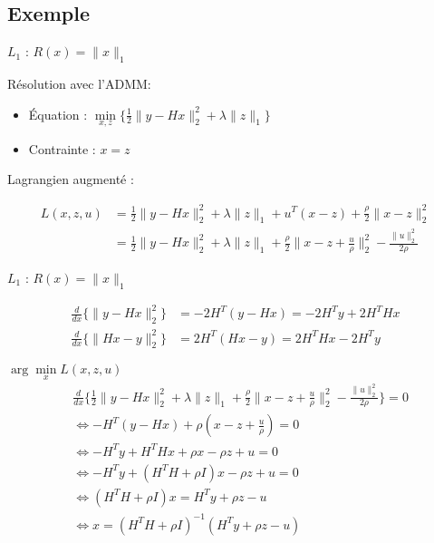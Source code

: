 \subsection{Exemple}

\frame{
    \tableofcontents[ 
        currentsubsection, 
    ]
}

\begin{frame}{$L_{1}$ : $R(x) = \lVert x \rVert_{1}$}

Résolution avec l'ADMM:
\begin{itemize}
    \item Équation : $\min\limits_{x, z} \{ 
        \frac{1}{2} \lVert y - Hx \rVert_{2}^{2} 
        + \lambda \lVert z \rVert_{1} 
    \}$
    \item Contrainte : $x = z$
\end{itemize}

\vspace{5mm}

Lagrangien augmenté :

\begin{align*}
L(x, z, u) 
&= \frac{1}{2} \lVert y - Hx \rVert_{2}^{2} 
+ \lambda \lVert z \rVert_{1} 
+ u^{T}(x-z) + \frac{\rho}{2} \lVert x-z \rVert_{2}^{2} \\
&= \frac{1}{2} \lVert y - Hx \rVert_{2}^{2} 
+ \lambda \lVert z \rVert_{1}
+ \frac{\rho}{2} \lVert x - z + \frac{u}{\rho} \rVert_{2}^{2} 
- \frac{\lVert u \rVert_{2}^{2}}{2\rho}    
\end{align*}

\end{frame}

\begin{frame}{$L_{1}$ : $R(x) = \lVert x \rVert_{1}$}

\begin{align*}
\frac{d}{dx} \{\lVert y - Hx \rVert_{2}^{2}\}
&= -2H^{T}(y-Hx) = -2H^{T}y + 2H^{T}Hx \\
\frac{d}{dx} \{\lVert Hx - y \rVert_{2}^{2}\}
&= 2H^{T}(Hx-y) = 2H^{T}Hx - 2H^{T}y
\end{align*}
\end{frame}

\begin{frame}{$\arg\min\limits_{x} {L(x, z, u)}$}
\begin{align*}
&\frac{d}{dx} \{
    \frac{1}{2} \lVert y - Hx \rVert_{2}^{2} 
    + \lambda \lVert z \rVert_{1} 
    + \frac{\rho}{2} \lVert x - z + \frac{u}{\rho} \rVert_{2}^{2} 
    - \frac{\lVert u \rVert_{2}^{2}}{2\rho}
\} = 0 \\
&\iff -H^{T} (y - Hx) + \rho (x - z + \frac{u}{\rho}) = 0 \\
&\iff -H^{T} y + H^{T} H x + \rho x - \rho z + u = 0 \\
&\iff -H^{T} y + (H^{T}H + \rho I) x - \rho z + u = 0 \\
&\iff (H^{T}H + \rho I) x = H^{T}y + \rho z - u\\
&\iff x = (H^{T}H + \rho I)^{-1} (H^{T} y + \rho z - u) \\
\end{align*}
\end{frame}

